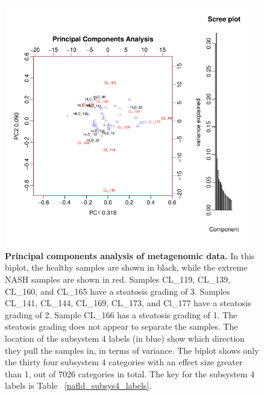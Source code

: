 \begin{figure}[h]
\begin{center}
\includegraphics[width=0.95\textwidth]{metagenomic_pca.png}
\caption[Principal components analysis of metagenomic data.]{\textbf{Principal components analysis of metagenomic data.} In this biplot, the healthy samples are shown in black, while the extreme NASH samples are shown in red. Samples CL\_119, CL\_139, CL\_160, and CL\_165 have a steatosis grading of 3. Samples CL\_141, CL\_144, CL\_169, CL\_173, and Cl\_177 have a steatosis grading of 2. Sample CL\_166 has a steatosis grading of 1. The steatosis grading does not appear to separate the samples. The location of the subsystem 4 labels (in blue) show which direction they pull the samples in, in terms of variance. The biplot shows only the thirty four subsystem 4 categories with an effect size greater than 1, out of 7026 categories in total. The key for the subsystem 4 labels is Table ~\ref{nafld_subsys4_labels}.}
\label{nafld_metagenomic_pca}
\end{center}
\end{figure}

